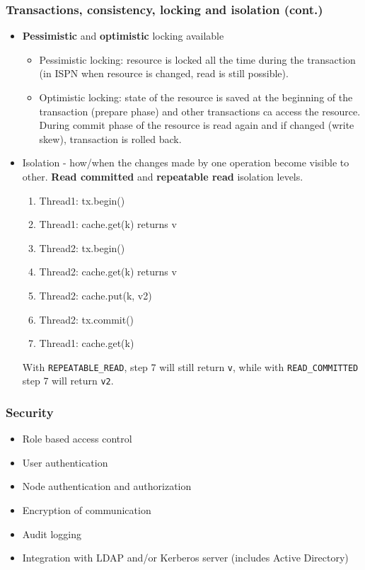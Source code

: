 \documentclass[10pt,utf8]{beamer}
\begin{document}
\begin{frame}
	\frametitle{Transactions, consistency, locking and isolation (cont.)}
	\begin{itemize}
		\item \textbf{Pessimistic} and \textbf{optimistic} locking available
		\begin{itemize}
		\pause
		\item Pessimistic locking: resource is locked all the time during the transaction (in ISPN when resource is changed, read is still possible).
		\pause
		\item Optimistic locking: state of the resource is saved at the beginning of the transaction (prepare phase) and other transactions ca access the resource. During commit phase of the resource 
		is read again and if changed (write skew), transaction is rolled back.
		\end{itemize}
		\pause
		\item Isolation - how/when the changes made by one operation become visible to other. \textbf{Read committed} and \textbf{repeatable read} isolation levels.
			\begin{enumerate}
				\pause
				\item \color{MyDarkGreen}Thread1: tx.begin()
				\pause
				\item Thread1: cache.get(k) returns v
				\pause
				\item \color{magenta}Thread2: tx.begin()
				\pause
				\item Thread2: cache.get(k) returns v
				\pause
				\item Thread2: cache.put(k, v2)
				\pause
				\item Thread2: tx.commit()
				\pause
				\item \color{MyDarkGreen}Thread1: cache.get(k)
				\pause
			\end{enumerate}
			With \texttt{REPEATABLE\_READ}, step 7 will still return \texttt{v}, while with \texttt{READ\_COMMITTED} step 7 will return \texttt{v2}.
	\end{itemize}
\end{frame}

\begin{frame}
	\frametitle{Security}
	\begin{itemize}
	 \item Role based access control
	 \pause
	 \item User authentication
	 \pause
	 \item Node authentication and authorization
	 \pause
	 \item Encryption of communication
	 \pause
	 \item Audit logging
	 \pause
	 \item Integration with LDAP and/or Kerberos server (includes Active Directory)
	\end{itemize}
\end{frame}
\end{document}
